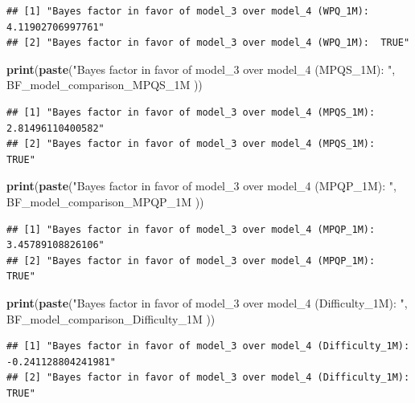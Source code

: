 \documentclass[
]{article}
\newenvironment{Shaded}{\begin{snugshade}}{\end{snugshade}}
\newcommand{\FunctionTok}[1]{\textcolor[rgb]{0.13,0.29,0.53}{\textbf{#1}}}
\newcommand{\NormalTok}[1]{#1}
\newcommand{\StringTok}[1]{\textcolor[rgb]{0.31,0.60,0.02}{#1}}
\begin{document}
\begin{verbatim}
## [1] "Bayes factor in favor of model_3 over model_4 (WPQ_1M):  4.11902706997761"
## [2] "Bayes factor in favor of model_3 over model_4 (WPQ_1M):  TRUE"
\end{verbatim}

\begin{Shaded}
\begin{Highlighting}[]
\FunctionTok{print}\NormalTok{(}\FunctionTok{paste}\NormalTok{(}\StringTok{"Bayes factor in favor of model\_3 over model\_4 (MPQS\_1M): "}\NormalTok{, BF\_model\_comparison\_MPQS\_1M ))}
\end{Highlighting}
\end{Shaded}

\begin{verbatim}
## [1] "Bayes factor in favor of model_3 over model_4 (MPQS_1M):  2.81496110400582"
## [2] "Bayes factor in favor of model_3 over model_4 (MPQS_1M):  TRUE"
\end{verbatim}

\begin{Shaded}
\begin{Highlighting}[]
\FunctionTok{print}\NormalTok{(}\FunctionTok{paste}\NormalTok{(}\StringTok{"Bayes factor in favor of model\_3 over model\_4 (MPQP\_1M): "}\NormalTok{, BF\_model\_comparison\_MPQP\_1M ))}
\end{Highlighting}
\end{Shaded}

\begin{verbatim}
## [1] "Bayes factor in favor of model_3 over model_4 (MPQP_1M):  3.45789108826106"
## [2] "Bayes factor in favor of model_3 over model_4 (MPQP_1M):  TRUE"
\end{verbatim}

\begin{Shaded}
\begin{Highlighting}[]
\FunctionTok{print}\NormalTok{(}\FunctionTok{paste}\NormalTok{(}\StringTok{"Bayes factor in favor of model\_3 over model\_4 (Difficulty\_1M): "}\NormalTok{, BF\_model\_comparison\_Difficulty\_1M ))}
\end{Highlighting}
\end{Shaded}

\begin{verbatim}
## [1] "Bayes factor in favor of model_3 over model_4 (Difficulty_1M):  -0.241128804241981"
## [2] "Bayes factor in favor of model_3 over model_4 (Difficulty_1M):  TRUE"
\end{verbatim}
\end{document}
